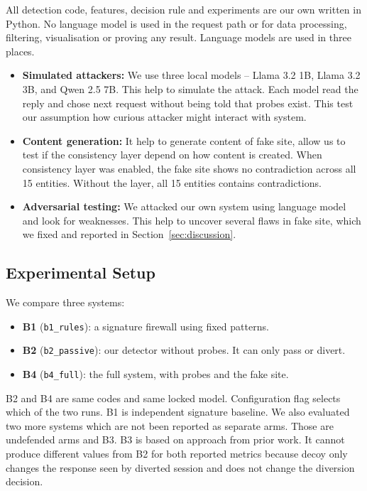 \documentclass[runningheads]{llncs}
\begin{document}
All detection code, features, decision rule and experiments are our own written in Python. No language model is used in the request path or for data processing, filtering, visualisation or proving any result. 
Language models are used in three places. 
\begin{itemize}
\item \textbf{Simulated attackers:} We use three local models -- Llama 3.2 1B, Llama 3.2 3B, and Qwen 2.5 7B. This help to simulate the attack. Each model read the reply and chose next request without being told that probes exist. This test our assumption how curious attacker might interact with system.
\item \textbf{Content generation:} It help to generate content of fake site, allow us to test if the consistency layer depend on how content is created. When consistency layer was enabled, the fake site shows no contradiction across all 15 entities. Without the layer, all 15 entities contains contradictions. 
\item \textbf{Adversarial testing:} We attacked our own system using language model and look for weaknesses. This help to uncover several flaws in fake site, which we fixed and reported in Section~\ref{sec:discussion}.
\end{itemize}


\subsection{Experimental Setup}
We compare three systems:
\begin{itemize}
\item \textbf{B1} (\texttt{b1\_rules}): a signature firewall using fixed patterns.
\item \textbf{B2} (\texttt{b2\_passive}): our detector without probes. It can only pass or divert.
\item \textbf{B4} (\texttt{b4\_full}): the full system, with probes and the fake site.
\end{itemize}

B2 and B4 are same codes and same locked model. Configuration flag selects which of the two runs. B1 is independent signature baseline. We also evaluated two more systems which are not been reported as separate arms. Those are undefended arms and B3. B3 is based on approach from prior work. It cannot produce different values from B2 for both reported metrics because decoy only changes the response seen by diverted session and does not change the diversion decision.
\end{document}
